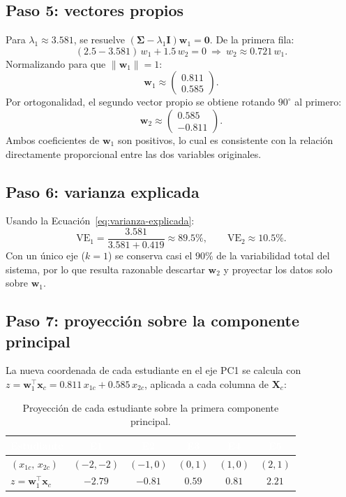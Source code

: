 \documentclass[11pt,letterpaper]{article}
\begin{document}
	\subsection{Paso 5: vectores propios}
	
	Para $\lambda_1\approx 3.581$, se resuelve $(\boldsymbol{\Sigma}-\lambda_1\mathbf{I})\mathbf{w}_1=\mathbf{0}$. De la primera fila:
	\[
	(2.5-3.581)\,w_{1} + 1.5\,w_{2} = 0 \ \Longrightarrow\ w_{2} \approx 0.721\,w_{1}.
	\]
	Normalizando para que $\|\mathbf{w}_1\|=1$:
	\[
	\mathbf{w}_1 \approx \begin{pmatrix} 0.811 \\ 0.585 \end{pmatrix}.
	\]
	Por ortogonalidad, el segundo vector propio se obtiene rotando $90^\circ$ al primero:
	\[
	\mathbf{w}_2 \approx \begin{pmatrix} 0.585 \\ -0.811 \end{pmatrix}.
	\]
	Ambos coeficientes de $\mathbf{w}_1$ son positivos, lo cual es consistente con la relación directamente proporcional entre las dos variables originales.
	
	\subsection{Paso 6: varianza explicada}
	
	Usando la Ecuación~\eqref{eq:varianza-explicada}:
	\[
	\mathrm{VE}_1 = \frac{3.581}{3.581+0.419} \approx 89.5\%, \qquad \mathrm{VE}_2 \approx 10.5\%.
	\]
	Con un único eje ($k=1$) se conserva casi el $90\%$ de la variabilidad total del sistema, por lo que resulta razonable descartar $\mathbf{w}_2$ y proyectar los datos solo sobre $\mathbf{w}_1$.
	
	\subsection{Paso 7: proyección sobre la componente principal}
	
	La nueva coordenada de cada estudiante en el eje PC1 se calcula con $z = \mathbf{w}_1^{\top}\mathbf{x}_c = 0.811\,x_{1c} + 0.585\,x_{2c}$, aplicada a cada columna de $\mathbf{X}_c$:
	
	\begin{table}[h!]
		\centering
		\caption{Proyección de cada estudiante sobre la primera componente principal.}
		\label{tab:proyeccion-caso}
		\begin{tabular}{@{}lccccc@{}}
			\toprule
			\rowcolor{accent!85}
			\textcolor{white}{\textbf{Estudiante}} & \textcolor{white}{E1} & \textcolor{white}{E2} & \textcolor{white}{E3} & \textcolor{white}{E4} & \textcolor{white}{E5} \\
			\midrule
			$(x_{1c},\,x_{2c})$ & $(-2,-2)$ & $(-1,0)$ & $(0,1)$ & $(1,0)$ & $(2,1)$ \\
			$z = \mathbf{w}_1^{\top}\mathbf{x}_c$ & $-2.79$ & $-0.81$ & $0.59$ & $0.81$ & $2.21$ \\
			\bottomrule
		\end{tabular}
	\end{table}
	
\end{document}
